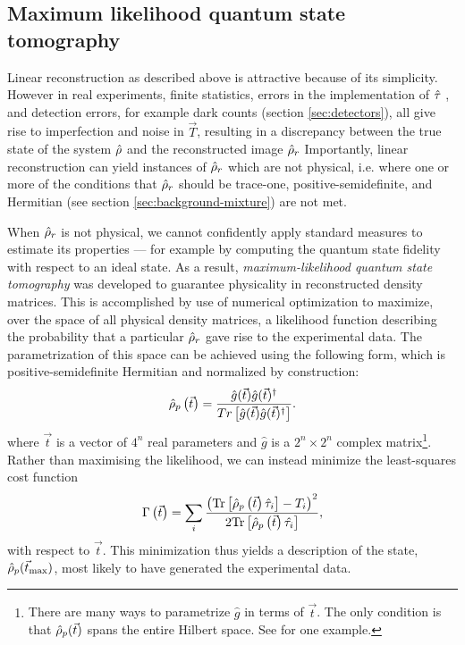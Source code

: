 \subsection{Maximum likelihood quantum state tomography}

Linear reconstruction as described above is attractive because of its simplicity. 
However in real experiments, finite statistics, errors in the implementation of $\hat{\tau}$ \cite{LangfordThesis}, and detection errors, for example dark counts (section \ref{sec:detectors}), all give rise to imperfection and noise in $\vec{T}$, resulting in a discrepancy between the true state of the system $\hat{\rho}$ and the reconstructed image $\hat{\rho}_r$  Importantly, linear reconstruction can yield instances of $\hat{\rho}_r$ which are not physical, i.e. where one or more of the conditions that $\hat{\rho}_r$ should be trace-one, positive-semidefinite, and Hermitian (see section \ref{sec:background-mixture}) are not met.  

When $\hat{\rho}_r$ is not physical, we cannot confidently apply standard measures to estimate its properties --- for example by computing the quantum state fidelity with respect to an ideal state. As a result, \emph{maximum-likelihood quantum state tomography} \cite{James2001} was developed to guarantee physicality in reconstructed density matrices.
This is accomplished by use of numerical optimization to maximize, over the space of all physical density matrices, a likelihood function describing the probability that a particular $\hat{\rho}_r$ gave rise to the experimental data. The parametrization of this space can be achieved using the following form, which is positive-semidefinite Hermitian and normalized by construction:
\begin{equation}
\hat{\rho}_{p}\left( \vec{t} \right) = \frac{\hat{g}(\vec{t}) \hat{g}(\vec{t})^{\dagger}} {Tr \left[ \hat{g}(\vec{t}) \hat{g}(\vec{t})^{\dagger} \right]}.
\label{eqn:physical-mixed-state}
\end{equation}
where $\vec{t}$ is a vector of 
$4^n$ 
real parameters and $\hat{g}$ is a $2^n \times 2^n$ complex matrix\footnote{There are many ways to parametrize $\hat{g}$ in terms of $\vec{t}$. The only condition is that $\hat{\rho}_p(\vec{t})$ spans the entire Hilbert space. See \cite{James2001} for one example.}.
Rather than maximising the likelihood, we can instead minimize the least-squares cost function 
\begin{equation}
    \Gamma \left( \vec{t} \right) = 
    \sum_i 
    \frac
    { \left( \mathrm{Tr}\left[ \hat{\rho}_p \left( \vec{t} \right) \hat{\tau}_i \right] - T_i \right)^2 }
    { 2 \mathrm{Tr} \left[ \hat{\rho}_p \left( \vec{t} \right) \hat{\tau_i} \right] }
    \label{eqn:ml_cost},
\end{equation}
with respect to $\vec{t}$. This minimization thus yields a description of the state, $\hat{\rho}_p(\vec{t}_\mathrm{max})$, most likely to have generated the experimental data.


